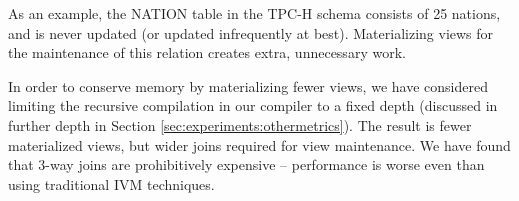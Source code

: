 
As an example, the NATION table in the TPC-H schema consists of 25 nations, and is never updated (or updated infrequently at best).  Materializing views for the maintenance of this relation creates extra, unnecessary work.


In order to conserve memory by materializing fewer views, we have considered limiting the recursive compilation in our compiler to a fixed depth (discussed in further depth in Section \ref{sec:experiments:othermetrics}).  The result is fewer materialized views, but wider joins required for view maintenance.  We have found that 3-way joins are prohibitively expensive -- performance is worse even than using traditional IVM techniques.